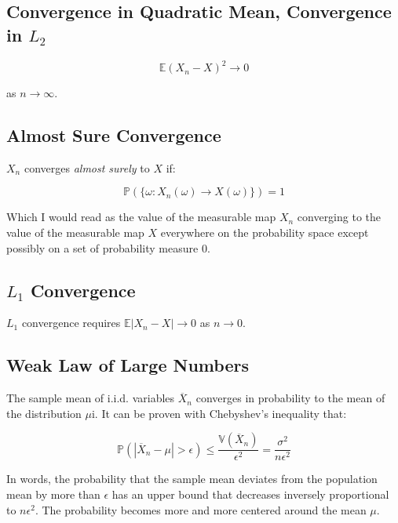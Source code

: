 \subsection{Convergence in Quadratic Mean, Convergence in $L_2$}

\begin{equation}
\mathbb{E}(X_n - X)^2 \rightarrow 0
\end{equation}

as $n\rightarrow \infty$.


\subsection{Almost Sure Convergence}

$X_n$ converges \textit{almost surely} to $X$ if:

\begin{equation}
\mathbb{P}(\{\omega: X_n(\omega) \rightarrow X(\omega) \}) = 1
\end{equation}

Which I would read as the value of the measurable map $X_n$ converging to the value of the measurable map $X$ everywhere on the probability space except possibly on a set of probability measure $0$.


\subsection{$L_1$ Convergence}

$L_1$ convergence requires $\mathbb{E}|X_n - X| \rightarrow 0$ as $n\rightarrow 0$.



\subsection{Weak Law of Large Numbers}

The sample mean of i.i.d. variables  $\overline{X}_n$ converges in probability to the mean of the distribution $\mu$i. It can be proven with Chebyshev's inequality that:

\begin{equation}
\mathbb{P}(|\overline{X}_n-\mu|>\epsilon) \leq \frac{\mathbb{V}(\overline{X}_n)}{\epsilon^2}=\frac{\sigma^2}{n \epsilon^2}
\end{equation}

In words, the probability that the sample mean deviates from the population mean by more than $\epsilon$ has an upper bound that decreases inversely proportional to $n\epsilon^2$. The probability becomes more and more centered around the mean $\mu$.

